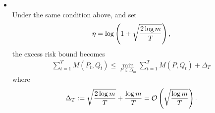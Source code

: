 \documentclass[11pt]{article}
\begin{document}
\begin{itemize}
\item \begin{corollary} \citep{schapire2012boosting}\\
Under the same condition above, and set 
\begin{align*}
\eta = \log\left(1 + \sqrt{\frac{2\log m}{T}}\right),
\end{align*} the excess risk bound becomes
\begin{align}
\sum_{t=1}^{T}M(P_t, Q_t) \le \min_{P \in \Delta_m}\sum_{t=1}^{T}M(P, Q_t) + \Delta_T \label{ineqn: excess_risk_bound_exp_weight_avg_delta}
\end{align} where
\begin{align*}
 \Delta_T := \sqrt{\frac{2\log m}{T}} + \frac{\log m}{T} = {\mathcal O}\left(\sqrt{\frac{\log m}{T}}\right).
\end{align*}
\end{corollary}
\end{itemize}
\end{document}
